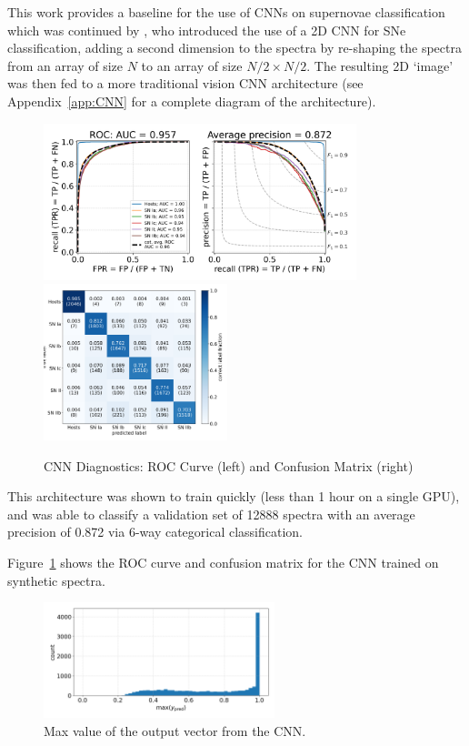 This work provides a baseline for the use of CNNs on supernovae classification 
which was continued by \textcite{Sepeku2022}, who introduced the use of a
2D CNN for SNe classification, adding a second dimension to the spectra by
re-shaping the spectra from an array of size $N$ to an array of size $N/2\times N/2$. 
The resulting 2D `image' was then fed to a more traditional vision 
CNN architecture (see Appendix~\ref{app:CNN} for a complete diagram of the architecture). 
\begin{figure}[t]
    \centering
    \includegraphics[height=4.55cm]{figures/cnn/cnn_rocfull.png}
    \quad
    \includegraphics[height=4.55cm]{figures/cnn/cnn_cmfull.png}
    \caption[CNN diagnostics]{CNN Diagnostics: ROC Curve (left) and Confusion Matrix (right)\label{fig:cnn_qual}}
\end{figure}
This architecture was shown to train quickly (less than 1 hour on a single GPU), 
and was able to classify a validation set of 12888 spectra with an average precision of 0.872
via 6-way categorical classification. 

Figure~\ref{fig:cnn_qual} shows the ROC curve and confusion matrix for the 
CNN trained on synthetic spectra. 
\begin{figure}[b]
    \centering
    \includegraphics[width=0.6\textwidth]{figures/cnn/cnn_max_ypred.png}
    \caption[CNN's Confidence in Classification]{Max value of the output vector from the CNN.\label{fig:cnn_max}}
\end{figure}


